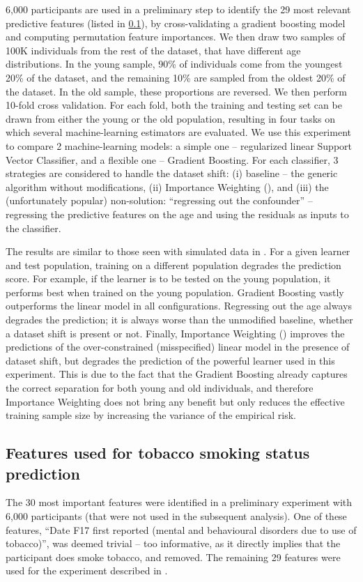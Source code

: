 \documentclass[a4paper,num-refs]{oup-contemporary}
\begin{document}
6,000 participants are used in a preliminary step to identify the 29 most relevant predictive features (listed in \cref{sec:ukb-features}), by cross-validating a gradient boosting model and computing permutation feature importances.
We then draw two samples of 100K individuals from the rest of the dataset, that have different age distributions.
In the young sample, 90\% of individuals come from the youngest 20\% of the dataset, and the remaining 10\% are sampled from  the oldest 20\% of the dataset.
In the old sample, these proportions are reversed.
We then perform 10-fold cross validation.
For each fold, both the training and testing set can be drawn from either the young or the old population, resulting in four tasks on which several machine-learning estimators are evaluated.
We use this experiment to compare 2 machine-learning models: a simple one -- regularized linear Support Vector Classifier, and a flexible one -- Gradient Boosting.
For each classifier, 3 strategies are considered to handle the dataset shift: (i) baseline -- the generic algorithm without modifications, (ii) Importance Weighting (), and (iii) the (unfortunately popular) non-solution: ``regressing out the confounder'' -- regressing the predictive features on the age and using the residuals as inputs to the classifier.

The results are similar to those seen with simulated data in .
For a given learner and test population, training on a different population degrades the prediction score.
For example, if the learner is to be tested on the young population, it performs best when trained on the young population.
Gradient Boosting vastly outperforms the linear model in all configurations.
Regressing out the age always degrades the prediction; it is always worse than the unmodified baseline, whether a dataset shift is present or not.
Finally, Importance Weighting () improves the predictions of the
over-constrained (misspecified) linear model in the presence of dataset shift, but degrades the prediction of the powerful learner used in this experiment.
This is due to the fact that the Gradient Boosting already captures the correct separation for both young and old individuals, and therefore Importance Weighting does not bring any benefit but only reduces the effective training sample size by increasing the variance of the empirical risk.


\subsection{Features used for tobacco smoking status prediction}
\label{sec:ukb-features}
The 30 most important features were identified in a preliminary experiment with 6,000 participants (that were not used in the subsequent analysis).
One of these features, ``Date F17 first reported (mental and behavioural disorders due to use of tobacco)'', was deemed trivial -- too informative, as it directly implies that the participant does smoke tobacco, and removed.
The remaining 29 features were used for the experiment described in .
\end{document}
